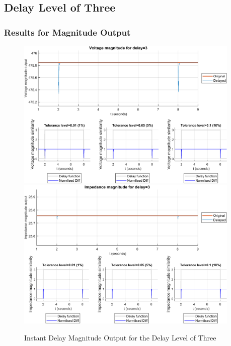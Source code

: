 \subsection{Delay Level of Three}
\subsubsection{Results for Magnitude Output}

\begin{figure}
    \caption{Instant Delay Magnitude Output for the Delay Level of Three}
    \includegraphics[width=0.95\textwidth]{PMUsim-figures/DelayOf_3/Instant_vMagnitude.png}    
      \includegraphics[width=0.95\textwidth]{PMUsim-figures/DelayOf_3/Instant_iMagnitude.png}
    \label{fig:PMUsim_Three_Magnitude}
    \begin{small}
     \end{small}
\end{figure}

